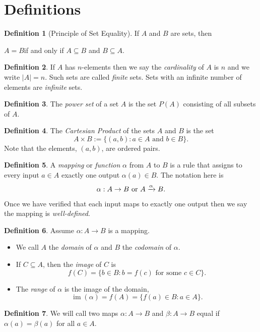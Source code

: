 \documentclass[12pt]{article}
\theoremstyle{definition}
\newtheorem*{defn}{Definition}
\newcommand{\im}{\operatorname{im}}
\begin{document}
\section*{Definitions}
\begin{defn}[Principle of Set Equality]
	If $A$ and $B$ are sets, then
	\begin{center}
		$A=B$\quad if and only if $A\subseteq B$ and $B\subseteq A$.
	\end{center}
\end{defn}
\begin{defn}
	If $A$ has $n$-elements then we say the \emph{cardinality} of $A$ is $n$ and we write $|A|=n$. Such sets are called \emph{finite} sets.  
	Sets with an infinite number of elements are \emph{infinite} sets.
\end{defn}
\begin{defn}
	The \emph{power set} of a set $A$ is the set $P(A)$ consisting of all subsets of $A$.
\end{defn}
\begin{defn}
The \emph{Cartesian Product} of the sets $A$ and $B$ is the set
\[A\times B:=\{(a,b):a\in A\text{ and }b\in B\}.\]
Note that the elements, $(a,b)$, are ordered pairs.
\end{defn}
\begin{defn}
A \emph{mapping} or \emph{function} $\alpha$ from $A$ to $B$ is a rule that assigns to every input $a\in A$ exactly one output $\alpha(a)\in B$.  The notation here is
\[\alpha:A\to B\textup{ or }A\xrightarrow{\alpha}B.\]

Once we have verified that each input maps to exactly one output then we say the mapping is \emph{well-defined}.
\end{defn}
\begin{defn} Assume $\alpha:A \to B$ is a mapping.
\begin{itemize}[label=--]
	\item We call $A$ the \emph{domain} of $\alpha$ and $B$ the \emph{codomain} of $\alpha$.
	\item If $C\subseteq A$, then the \emph{image} of $C$ is \[f(C)=\{b\in B : b=f(c)\text{ for some } c\in C\}.\] 
	\item The \emph{range} of $\alpha$ is the image of the domain, \[\im(\alpha)=f(A)=\{f(a)\in B : a\in A\}.\]
\end{itemize}
\end{defn}
\begin{defn}
We will call two maps $\alpha:A\to B$ and $\beta:A\to B$ equal if $\alpha(a)=\beta(a)$ for all $a\in A$.
\end{defn}
\end{document}
